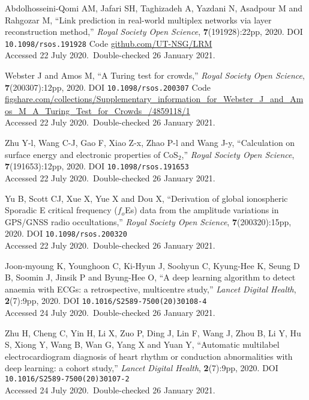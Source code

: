 \vbox{
Abdolhosseini-Qomi AM,  Jafari SH,  Taghizadeh A,  Yazdani N,  Asadpour M and  Rahgozar M, ``Link prediction in real-world multiplex networks via layer reconstruction method,'' \emph{Royal Society Open Science}, \textbf{7}(191928):22pp, 2020. DOI \texttt{10.1098/rsos.191928} {Code \url{github.com/UT-NSG/LRM}}\\\hfill{Accessed 22 July 2020.}\ {Double-checked 26 January 2021}.}\bibskip

\vbox{
Webster J and  Amos M, ``A Turing test for crowds,'' \emph{Royal Society Open Science}, \textbf{7}(200307):12pp, 2020. DOI \texttt{10.1098/rsos.200307} {Code \url{figshare.com/collections/Supplementary_information_for_Webster_J_and_Amos_M_A_Turing_Test_for_Crowds_/4859118/1}}\\\hfill{Accessed 22 July 2020.}\ {Double-checked 26 January 2021}.}\bibskip

\vbox{
Zhu Y-l,  Wang C-J,  Gao F,  Xiao Z-x,  Zhao P-l and  Wang J-y, ``Calculation on surface energy and electronic properties of CoS${}_2$,'' \emph{Royal Society Open Science}, \textbf{7}(191653):12pp, 2020. DOI \texttt{10.1098/rsos.191653}\\\hfill{Accessed 22 July 2020.}\ {Double-checked 26 January 2021}.}\bibskip

\vbox{
Yu B,  Scott CJ,  Xue X,  Yue X and  Dou X, ``Derivation of global ionospheric Sporadic E critical frequency ($f_o$Es) data from the amplitude variations in GPS/GNSS radio occultations,'' \emph{Royal Society Open Science}, \textbf{7}(200320):15pp, 2020. DOI \texttt{10.1098/rsos.200320}\\\hfill{Accessed 22 July 2020.}\ {Double-checked 26 January 2021}.}\bibskip

\vbox{
Joon-myoung K,  Younghoon C,  Ki-Hyun J,  Soohyun C,  Kyung-Hee K,  Seung D B,  Soomin J,  Jinsik P and  Byung-Hee O, ``A deep learning algorithm to detect anaemia with ECGs: a retrospective, multicentre study,'' \emph{Lancet Digital Health}, \textbf{2}(7):9pp, 2020. DOI \texttt{10.1016/S2589-7500(20)30108-4}\\\hfill{Accessed 24 July 2020.}\ {Double-checked 26 January 2021}.}\bibskip

\vbox{
Zhu H,  Cheng C,  Yin H,  Li X,  Zuo P,  Ding J,  Lin F,  Wang J,  Zhou B,  Li Y,  Hu S,  Xiong Y,  Wang B,  Wan G,  Yang X and  Yuan Y, ``Automatic multilabel electrocardiogram diagnosis of heart rhythm or conduction abnormalities with deep learning: a cohort study,'' \emph{Lancet Digital Health}, \textbf{2}(7):9pp, 2020. DOI \texttt{10.1016/S2589-7500(20)30107-2}\\\hfill{Accessed 24 July 2020.}\ {Double-checked 26 January 2021}.}\bibskip


